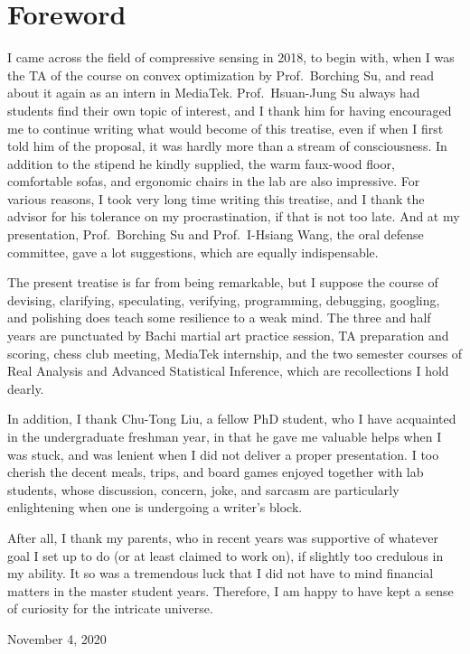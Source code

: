 \chapter* {Foreword}

I came across the field of compressive sensing in 2018, to begin with, when I was the TA of the course on convex optimization by Prof.\ Borching Su, and read about it again as an intern in MediaTek.
Prof.\ Hsuan-Jung Su always had students find their own topic of interest, and I thank him for having encouraged me to continue writing what would become of this treatise, even if when I first told him of the proposal, it was hardly more than a stream of consciousness.
In addition to the stipend he kindly supplied, the warm faux-wood floor, comfortable sofas, and ergonomic chairs in the lab are also impressive.
For various reasons, I took very long time writing this treatise, and I thank the advisor for his tolerance on my procrastination, if that is not too late.
And at my presentation, Prof.\ Borching Su and Prof.\ I-Hsiang Wang, the oral defense committee, gave a lot suggestions, which are equally indispensable.

The present treatise is far from being remarkable, but I suppose the course of devising, clarifying, speculating, verifying, programming, debugging, googling, and polishing does teach some resilience to a weak mind.
The three and half years are punctuated by Bachi martial art practice session, TA preparation and scoring, chess club meeting, MediaTek internship, and the two semester courses of Real Analysis and Advanced Statistical Inference, which are recollections I hold dearly.

In addition, I thank Chu-Tong Liu, a fellow PhD student, who I have acquainted in the undergraduate freshman year, in that he gave me valuable helps when I was stuck, and was lenient when I did not deliver a proper presentation.
I too cherish the decent meals, trips, and board games enjoyed together with lab students, whose discussion, concern, joke, and sarcasm are particularly enlightening when one is undergoing a writer's block.

After all, I thank my parents, who in recent years was supportive of whatever goal I set up to do (or at least claimed to work on), if slightly too credulous in my ability.
It so was a tremendous luck that I did not have to mind financial matters in the master student years.
Therefore, I am happy to have kept a sense of curiosity for the intricate universe.

November 4, 2020


